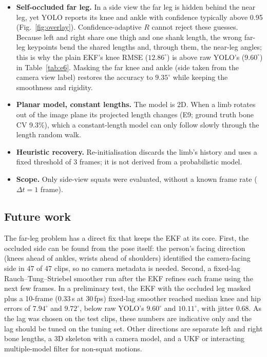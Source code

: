 \documentclass[12pt,a4paper]{article}
\begin{document}
\begin{itemize}[itemsep=3pt]
    \item \textbf{Self-occluded far leg.} In a side view the far leg is hidden behind the near leg, yet
          YOLO reports its knee and ankle with confidence typically above 0.95 (Fig.~\ref{fig:overlay}).
          Confidence-adaptive $R$ cannot reject these guesses. Because left and right share one thigh and
          one shank length, the wrong far-leg keypoints bend the shared lengths and, through them, the
          near-leg angles; this is why the plain EKF's knee RMSE ($12.86^\circ$) is above raw YOLO's
          ($9.60^\circ$) in Table~\ref{tab:e6}. Masking the far knee and ankle (side taken from the camera
          view label) restores the accuracy to $9.35^\circ$ while keeping the smoothness and rigidity.
    \item \textbf{Planar model, constant lengths.} The model is 2D. When a limb rotates out of the image
          plane its projected length changes (E9; ground truth bone CV 9.3\%), which a constant-length model
          can only follow slowly through the length random walk.
    \item \textbf{Heuristic recovery.} Re-initialisation discards the limb's history and uses a fixed
          threshold of 3 frames; it is not derived from a probabilistic model.
    \item \textbf{Scope.} Only side-view squats were evaluated, without a known frame rate ($\Delta t = 1$
          frame).
\end{itemize}

\subsection{Future work}

The far-leg problem has a direct fix that keeps the EKF at its core. First, the occluded side can be found
from the pose itself: the person's facing direction (knees ahead of ankles, wrists ahead of shoulders)
identified the camera-facing side in 47 of 47 clips, so no camera metadata is needed. Second, a fixed-lag
Rauch--Tung--Striebel smoother \cite{rts} run after the EKF refines each frame using the next few frames.
In a preliminary test, the EKF with the occluded leg masked plus a 10-frame (0.33\,s at 30\,fps) fixed-lag
smoother reached median knee and hip errors of $7.94^\circ$ and $9.72^\circ$, below raw YOLO's
$9.60^\circ$ and $10.11^\circ$, with jitter 0.68. As the lag was chosen on the test clips, these numbers are
indicative only and the lag should be tuned on the tuning set. Other directions are separate left and right
bone lengths, a 3D skeleton with a camera model, and a UKF or interacting multiple-model filter for
non-squat motions.
\newpage
\end{document}
